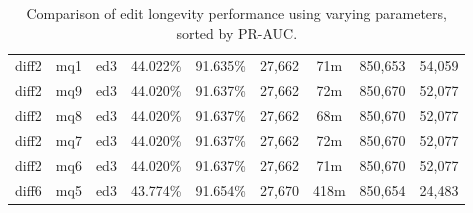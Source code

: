 \begin{sidewaystable}[!ph]
\begin{center}
\begin{tabular}{|c|c|c||c|c||c|c|c|c|}
diff2 & mq1 & ed3 & 44.022\% & 91.635\% & 27,662 & 71m & 850,653 & 54,059 \\
diff2 & mq9 & ed3 & 44.020\% & 91.637\% & 27,662 & 72m & 850,670 & 52,077 \\
diff2 & mq8 & ed3 & 44.020\% & 91.637\% & 27,662 & 68m & 850,670 & 52,077 \\
diff2 & mq7 & ed3 & 44.020\% & 91.637\% & 27,662 & 72m & 850,670 & 52,077 \\
diff2 & mq6 & ed3 & 44.020\% & 91.637\% & 27,662 & 71m & 850,670 & 52,077 \\
diff6 & mq5 & ed3 & 43.774\% & 91.654\% & 27,670 & 418m & 850,654 & 24,483 \\
\hline
\end{tabular}
\end{center}
\caption{Comparison of edit longevity performance using
    varying parameters, sorted by PR-AUC.}
\label{tab:editshoutC}
\end{sidewaystable}
\clearpage
